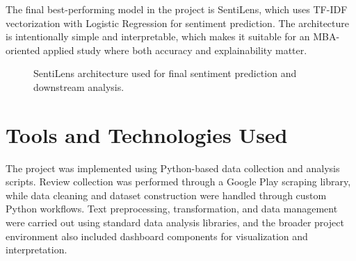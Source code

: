 The final best-performing model in the project is SentiLens, which uses TF-IDF vectorization with Logistic Regression for sentiment prediction. The architecture is intentionally simple and interpretable, which makes it suitable for an MBA-oriented applied study where both accuracy and explainability matter.

\begin{figure}[H]
\centering
{}
\caption{SentiLens architecture used for final sentiment prediction and downstream analysis.}
\label{fig:sentilens-architecture}
\end{figure}

\section{Tools and Technologies Used}

The project was implemented using Python-based data collection and analysis scripts. Review collection was performed through a Google Play scraping library, while data cleaning and dataset construction were handled through custom Python workflows. Text preprocessing, transformation, and data management were carried out using standard data analysis libraries, and the broader project environment also included dashboard components for visualization and interpretation.


